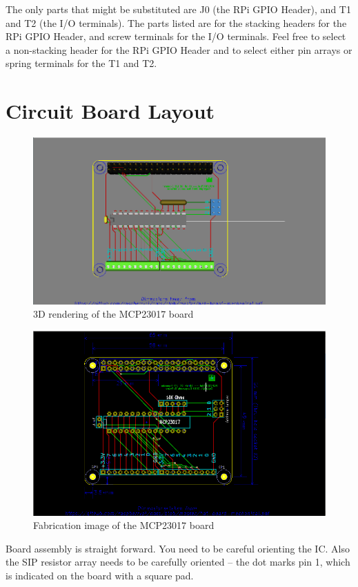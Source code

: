 The only parts that might be substituted are J0 (the RPi GPIO Header), and T1
and T2 (the I/O terminals). The parts listed are for the stacking headers for 
the RPi GPIO Header, and screw terminals for the I/O terminals.  Feel free to 
select a non-stacking header for the RPi GPIO Header and to select either pin 
arrays or spring terminals for the T1 and T2.                   

\section{Circuit Board Layout}

\begin{figure}[hbpt]\begin{centering}%
\includegraphics[width=5in]{MCP230173DTop.png}
\caption{3D rendering of the MCP23017 board}
\end{centering}\end{figure}
\begin{figure}[hbpt]\begin{centering}%
\includegraphics[width=5in]{MCP23017.png}
\caption{Fabrication image of the MCP23017 board}
\end{centering}\end{figure}
Board assembly is straight forward. You need to be careful orienting the IC.
Also the SIP resistor array needs to be carefully oriented -- the dot marks
pin 1, which is indicated on the board with a square pad. 

